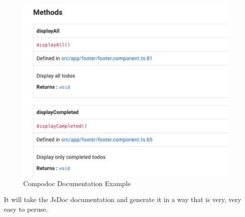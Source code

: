 \begin{figure}[h!]
\caption{Compodoc Documentation Example}
\includegraphics[width=414pt]{graphics/compodoc/documentation/documentation-coverage.pdf}
\end{figure}

It will take the JsDoc documentation and generate it in a way that is very, very easy to peruse. 